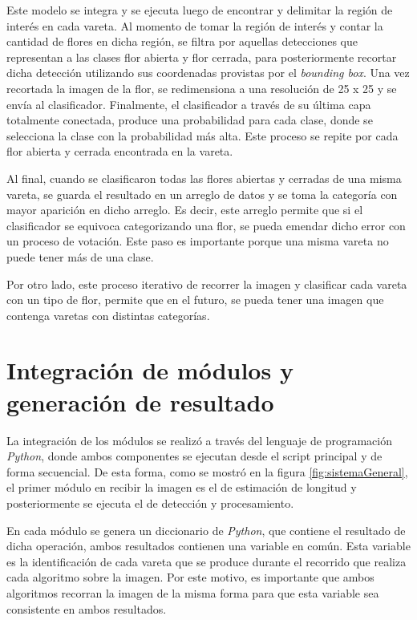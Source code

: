 Este modelo se integra y se ejecuta luego de encontrar y delimitar la región de interés en cada vareta. Al momento de tomar la región de interés y contar la cantidad de flores en dicha región, se filtra por aquellas detecciones que representan a las clases flor abierta y flor cerrada, para posteriormente recortar dicha detección utilizando sus coordenadas provistas por el \textit{bounding box}. Una vez recortada la imagen de la flor, se redimensiona a una resolución de 25 x 25 y se envía al clasificador. Finalmente, el clasificador a través de su última capa totalmente conectada, produce una probabilidad para cada clase, donde se selecciona la clase con la probabilidad más alta. Este proceso se repite por cada flor abierta y cerrada encontrada en la vareta. 

Al final, cuando se clasificaron todas las flores abiertas y cerradas de una misma vareta, se guarda el resultado en un arreglo de datos y se toma la categoría con mayor aparición en dicho arreglo. Es decir, este arreglo permite que si el clasificador se equivoca categorizando una flor, se pueda emendar dicho error con un proceso de votación. Este paso es importante porque una misma vareta no puede tener más de una clase. 

Por otro lado, este proceso iterativo de recorrer la imagen y clasificar cada vareta con un tipo de flor, permite que en el futuro, se pueda tener una imagen que contenga varetas con distintas categorías.
\newpage
\section{Integración de módulos y generación de resultado}

La integración de los módulos se realizó a través del lenguaje de programación \textit{Python}, donde ambos componentes se ejecutan desde el script principal y de forma secuencial. De esta forma, como se mostró en la figura \ref{fig:sistemaGeneral}, el primer módulo en recibir la imagen es el de estimación de longitud y posteriormente se ejecuta el de detección y procesamiento.

En cada módulo se genera un diccionario de \textit{Python}, que contiene el resultado de dicha operación, ambos resultados contienen una variable en común. Esta variable es la identificación de cada vareta que se produce durante el recorrido que realiza cada algoritmo sobre la imagen. Por este motivo, es importante que ambos algoritmos recorran la imagen de la misma forma para que esta variable sea consistente en ambos resultados.

